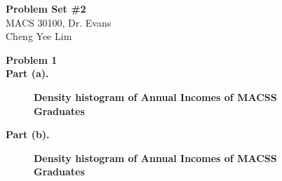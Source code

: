 \documentclass[letterpaper,12pt]{article}
\theoremstyle{definition}
\begin{document}
\begin{flushleft}
  \textbf{\large{Problem Set \#2}} \\
  MACS 30100, Dr. Evans \\
  Cheng Yee Lim
\end{flushleft}

\vspace{5mm}

\noindent\textbf{Problem 1}\\
\textbf{Part (a).}
\begin{figure}[htb]\centering\captionsetup{width=4.0in}
  \caption{\textbf{Density histogram of Annual Incomes of MACSS Graduates}}\label{FigExample}
\end{figure}

\pagebreak
\textbf{Part (b).} \\
\begin{figure}[htb]\centering\captionsetup{width=4.0in}
  \caption{\textbf{Density histogram of Annual Incomes of MACSS Graduates}}\label{FigExample}
\end{figure}
\end{document}

